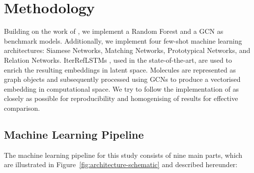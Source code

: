 \documentclass[journal=jcisd8,manuscript=article]{achemso} %
\begin{document}
\section{Methodology}

Building on the work of \citet{altae2017low}, we implement a Random Forest and a GCN as benchmark models. Additionally, we implement four few-shot machine learning architectures: Siamese Networks, Matching Networks, Prototypical Networks, and Relation Networks. IterRefLSTMs \citep{altae2017low}, used in the state-of-the-art, are used to enrich the resulting embeddings in latent space. Molecules are represented as graph objects and subsequently processed using GCNs to produce a vectorised embedding in computational space. We try to follow the implementation of \citet{altae2017low} as closely as possible for reproducibility and homogenising of results for effective comparison.

\subsection{Machine Learning Pipeline}

The machine learning pipeline for this study consists of nine main parts, which are illustrated in Figure~\ref{fig:architecture-schematic} and described hereunder:
\end{document}
